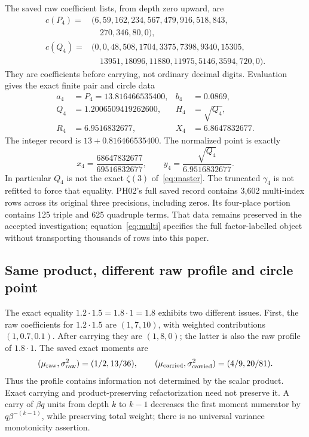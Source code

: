 \documentclass[11pt,a4paper]{article}
\begin{document}
The saved raw coefficient lists, from depth zero upward, are
\begin{equation}
\begin{aligned}
 c(P_4)={}&(6,59,162,234,567,479,916,518,843,\\
          &\hspace{1em}270,346,80,0),\\
 c(Q_4)={}&(0,0,48,508,1704,3375,7398,9340,15305,\\
          &\hspace{1em}13951,18096,11880,11975,5146,3594,720,0).
\end{aligned}
\label{eq:rawlists}
\end{equation}
They are coefficients before carrying, not ordinary decimal digits. Evaluation gives the exact finite pair and circle data
\begin{equation}
\begin{aligned}
 a_4&=P_4=13.816466535400,& b_4&=0.0869,\\
 Q_4&=1.2006509419262600,& H_4&=\sqrt{Q_4},\\
 R_4&=6.9516832677,& X_4&=6.8647832677.
\end{aligned}
\label{eq:fourcircle}
\end{equation}
The integer record is $13+0.816466535400$. The normalized point is exactly
\begin{equation}
 x_4=\frac{68647832677}{69516832677},\qquad
 y_4=\frac{\sqrt{Q_4}}{6.9516832677}.
 \label{eq:fournormal}
\end{equation}
In particular $Q_4$ is not the exact $\zeta(3)$ of~\eqref{eq:master}. The truncated $\gamma_4$ is not refitted to force that equality. PH02's full saved record contains 3,602 multi-index rows across its original three precisions, including zeros. Its four-place portion contains 125 triple and 625 quadruple terms. That data remains preserved in the accepted investigation; equation~\eqref{eq:multi} specifies the full factor-labelled object without transporting thousands of rows into this paper.

\subsection{Same product, different raw profile and circle point}
The exact equality $1.2\cdot1.5=1.8\cdot1=1.8$ exhibits two different issues. First, the raw coefficients for $1.2\cdot1.5$ are $(1,7,10)$, with weighted contributions $(1,0.7,0.1)$. After carrying they are $(1,8,0)$; the latter is also the raw profile of $1.8\cdot1$. The saved exact moments are
\begin{equation}
 (\mu_{\rm raw},\sigma^2_{\rm raw})=(1/2,13/36),\qquad
 (\mu_{\rm carried},\sigma^2_{\rm carried})=(4/9,20/81).
 \label{eq:countermoments}
\end{equation}
Thus the profile contains information not determined by the scalar product. Exact carrying and product-preserving refactorization need not preserve it. A carry of $\beta q$ units from depth $k$ to $k-1$ decreases the first moment numerator by $q\beta^{-(k-1)}$, while preserving total weight; there is no universal variance monotonicity assertion.
\end{document}
